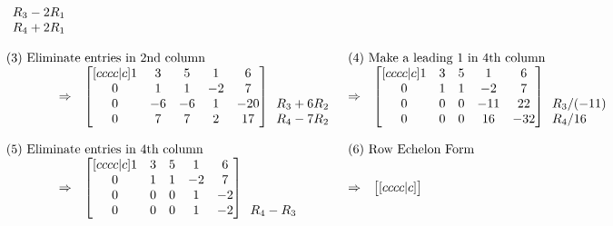 \begin{example}
{$$\begin{array}{rlcl}
  \begin{array}{lr} \ \\ \ \\ R_3-2R_1 \\ R_4+2R_1 \end{array}
\\ \\
\multicolumn{2}{l}{\text{(3) Eliminate entries in 2nd column}}&
\multicolumn{2}{l}{\text{(4) Make a leading 1 in 4th column}}\\
\Rightarrow&
\begin{bmatrix}[cccc|c]
  1 & 3 & 5 & 1 & 6 \\
 0 & 1 & 1 & -2 & 7 \\
 0 & -6 & -6 & 1 & -20 \\
 0 & 7 & 7 & 2 & 17
\end{bmatrix}
  \begin{array}{lr} \ \\ \ \\ R_3+6R_2 \\ R_4-7R_2 \end{array}
&\Rightarrow& 
\begin{bmatrix}[cccc|c]
  1 & 3 & 5 & 1 & 6 \\
 0 & 1 & 1 & -2 & 7 \\
 0 & 0 & 0 & -11 & 22 \\
 0 & 0 & 0 & 16 & -32
\end{bmatrix}
  \begin{array}{lr} \ \\ \ \\ R_3/(-11) \\ R_4/16 \end{array}
\\ \\
\multicolumn{2}{l}{\text{(5) Eliminate entries in 4th column}}&
\multicolumn{2}{l}{\text{(6) Row Echelon Form}}\\
\Rightarrow&
\begin{bmatrix}[cccc|c]
  1 & 3 & 5 & 1 & 6 \\
 0 & 1 & 1 & -2 & 7 \\
 0 & 0 & 0 & 1 & -2 \\
 0 & 0 & 0 & 1 & -2
\end{bmatrix}
  \begin{array}{lr} \ \\ \ \\ \ \\ R_4-R_3 \end{array}
&\Rightarrow& 
\begin{bmatrix}[cccc|c]

\end{bmatrix}
\end{array}$$}
\end{example}
